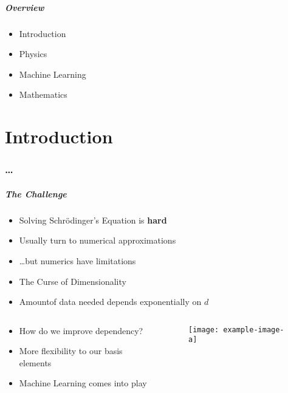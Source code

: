 \begin{frame}
    \frametitle{Overview}
    \begin{itemize}[<+>]
        \item {Introduction}
        \item {Physics}
        \item {Machine Learning}
        \item {Mathematics}
    \end{itemize}
\end{frame}
\part[Part slide]{Introduction}
\makepart%

\section{\ldots}

\begin{frame}[t,label=intro]
\frametitle{The Challenge}

\begin{itemize}[<+->]
    \setlength\itemsep{.8em}
    \item Solving Schrödinger's Equation is \textbf{hard}
    \item Usually turn to numerical approximations
    \item \ldots but numerics have limitations
    \item The Curse of Dimensionality
    \item Amountof data needed depends exponentially on $d$
\end{itemize}

\begin{columns}
    \begin{column}[t]{0.48\textwidth}
        \begin{itemize}[<+->]
            \setlength\itemsep{.8em}
            \item How do we improve dependency?
            \item More flexibility to our basis elements 
            \item Machine Learning comes into play
        \end{itemize}
    \end{column}
    \begin{column}[t]{0.48\textwidth}
        \begin{figure}
            \texttt{[image: example-image-a]}
        \end{figure}
    \end{column}
\end{columns}


\end{frame}
